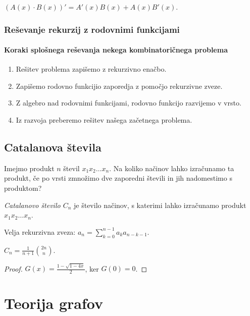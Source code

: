 \begin{trditev}
    $(A(x) \cdot B(x))' = A'(x)B(x) + A(x)B'(x)$.
\end{trditev}

\subsubsection*{Reševanje rekurzij z rodovnimi funkcijami}
\paragraph{Koraki splošnega reševanja nekega kombinatoričnega problema}
\begin{enumerate}
    \item Rešitev problema zapišemo z rekurzivno enačbo.
    \item Zapišemo rodovno funkcijio zaporedja z pomočjo rekurzivne zveze.
    \item Z algebro nad rodovnimi funkcijami, rodovno funkcijo razvijemo v vrsto.
    \item Iz razvoja preberemo rešitev našega začetnega problema.
\end{enumerate}

\subsection{Catalanova števila}
Imejmo produkt $n$ števil $x_1x_2 \ldots x_n$. Na koliko načinov lahko izračunamo ta produkt, če po vrsti zmnožimo dve zaporedni števili in jih nadomestimo s produktom?

\begin{definicija}
    \emph{Catalanovo število $C_n$} je število načinov, s katerimi lahko izračunamo produkt $x_1x_2 \ldots x_n$.
\end{definicija}

\begin{opomba}
    Velja rekurzivna zveza: $a_n = \sum_{k=0}^{n-1}a_ka_{n-k-1}$.
\end{opomba}

\begin{trditev}
    $C_n = \frac{1}{n+1} \binom{2n}{n}$.
\end{trditev}

\begin{proof}
    $G(x) = \frac{1-\sqrt{1-4x}}{2}$, ker $G(0)= 0$.
\end{proof}

\section{Teorija grafov}
